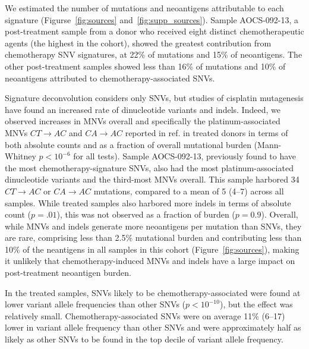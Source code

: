 We estimated the number of mutations and neoantigens attributable to each signature (Figurse~\ref{fig:sources} and~\ref{fig:supp_sources}). Sample AOCS-092-13, a post-treatment sample from a donor who received eight distinct chemotherapeutic agents (the highest in the cohort), showed the greatest contribution from chemotherapy SNV signatures, at 22\% of mutations and 15\% of neoantigens. The other post-treatment samples showed less than 16\% of mutations and 10\% of neoantigens attributed to chemotherapy-associated SNVs.

Signature deconvolution considers only SNVs, but studies of cisplatin mutagenesis have found an increased rate of dinucleotide variants and indels. Indeed, we observed increases in MNVs overall and specifically the platinum-associated MNVs $CT \rightarrow AC$ and $CA \rightarrow AC$ reported in ref. \cite{Meier_2014} in treated donors in terms of both absolute counts and as a fraction of overall mutational burden (Mann-Whitney $p\lt10^{-6}$ for all tests). Sample AOCS-092-13, previously found to have the most chemotherapy-signature SNVs, also had the most platinum-associated dinucleotide variants and the third-most MNVs overall. This sample harbored 34 $CT \rightarrow AC$ or $CA \rightarrow AC$ mutations, compared to a mean of 5 (4--7) across all samples. While treated samples also harbored more indels in terms of absolute count ($p=.01$), this was not observed as a fraction of burden ($p=0.9$). Overall, while MNVs and indels generate more neoantigens per mutation than SNVs, they are rare, comprising less than 2.5\% mutational burden and contributing less than 10\% of the neantigens in all samples in this cohort (Figure~\ref{fig:sources}), making it unlikely that chemotherapy-induced MNVs and indels have a large impact on post-treatment neoantigen burden.

In the treated samples, SNVs likely to be chemotherapy-associated were found at lower variant allele frequencies than other SNVs ($p \lt 10^{-10}$), but the effect was relatively small. Chemotherapy-associated SNVs were on average 11\% (6--17) lower in variant allele frequency than other SNVs and were approximately half as likely as other SNVs to be found in the top decile of variant allele frequency.